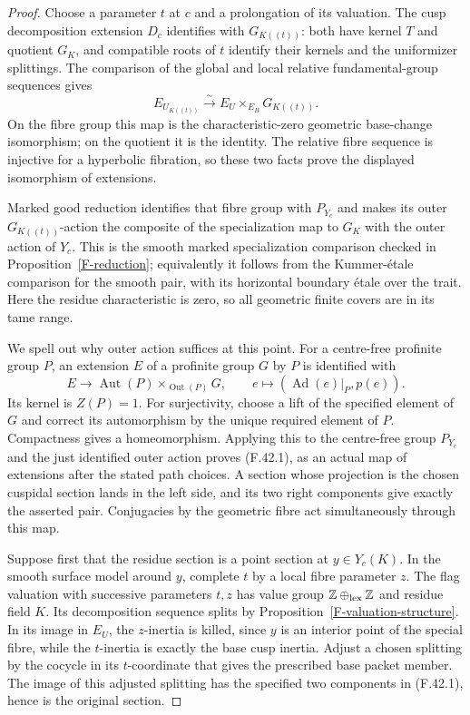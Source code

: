 \documentclass[11pt,oneside]{article}
\begin{document}
\begin{proof}
Choose a parameter $t$ at $c$ and a prolongation of its
valuation. The cusp decomposition extension $D_c$ identifies
with $G_{K((t))}$: both have kernel $T$ and quotient $G_K$,
and compatible roots of $t$ identify their kernels and the
uniformizer splittings. The comparison of the global and
local relative fundamental-group sequences gives
\[
 E_{U_{K((t))}}\xrightarrow{\sim}
            E_U\mathbin{\times}_{E_B}G_{K((t))}.
\]
On the fibre group this map is the characteristic-zero
geometric base-change isomorphism; on the quotient it is the
identity. The relative fibre sequence is injective for a
hyperbolic fibration, so these two facts prove the displayed
isomorphism of extensions.

Marked good reduction identifies that fibre group with
$P_{Y_c}$ and makes its outer $G_{K((t))}$-action the
composite of the specialization map to $G_K$ with the
outer action of $Y_c$. This is the smooth marked
specialization comparison checked in
Proposition~\ref{F-reduction}; equivalently it follows from
the Kummer-\'etale comparison for the smooth pair, with
its horizontal boundary \'etale over the trait.
Here the residue characteristic is zero, so all geometric
finite covers are in its tame range.

We spell out why outer action suffices at this point.
For a centre-free profinite group $P$, an extension $E$
of a profinite group $G$ by $P$ is identified with
\[
 E\longrightarrow
 \operatorname{Aut}(P)\mathbin{\times}_{\operatorname{Out}(P)}G,
 \qquad e\longmapsto(\operatorname{Ad}(e)|_P,p(e)).
\]
Its kernel is $Z(P)=1$. For surjectivity, choose a lift of
the specified element of $G$ and correct its automorphism
by the unique required element of $P$. Compactness gives a
homeomorphism. Applying this to the centre-free group
$P_{Y_c}$ and the just identified outer action proves
(F.42.1), as an actual map of extensions after the stated
path choices. A section whose projection is the chosen
cuspidal section lands in the left side, and its two right
components give exactly the asserted pair. Conjugacies by
the geometric fibre act simultaneously through this map.

Suppose first that the residue section is a point section
at $y\in Y_c(K)$. In the smooth surface model around $y$,
complete $t$ by a local fibre parameter $z$. The flag
valuation with successive parameters $t,z$ has value group
$\mathbb Z\oplus_{\rm lex}\mathbb Z$ and residue field
$K$. Its decomposition sequence splits by
Proposition~\ref{F-valuation-structure}. In its image in
$E_U$, the $z$-inertia is killed, since $y$ is an interior
point of the special fibre, while the $t$-inertia is exactly
the base cusp inertia. Adjust a chosen splitting by the
cocycle in its $t$-coordinate that gives the prescribed
base packet member. The image of this adjusted splitting
has the specified two components in (F.42.1), hence is the
original section.


\end{proof}
\end{document}
